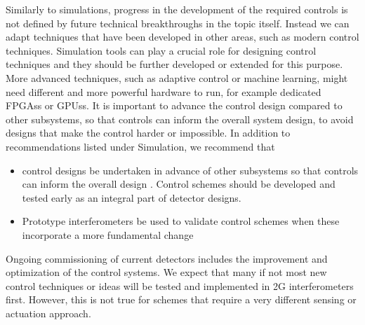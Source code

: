 Similarly to simulations, progress in the development of the required controls is not defined by future technical breakthroughs in the topic itself. Instead we can adapt techniques that have been developed in other areas, such as modern control techniques. Simulation tools can play a crucial role for designing control techniques and they should be further developed or extended for this purpose. More advanced techniques, such as adaptive control or machine learning, might need different and more powerful hardware to run, for example dedicated \acp{FPGA}s or \acp{GPU}s. It is important to advance the control design compared to other subsystems, so that controls can inform the overall system design, to avoid designs that make the control harder or impossible. 
In addition to recommendations listed under Simulation, we recommend that
\begin{itemize}
\item control designs be undertaken in advance of other subsystems so that controls can inform the overall design .  Control schemes should be developed and tested early as an integral part of detector designs.
\item Prototype interferometers be used to validate control schemes when these incorporate a more fundamental change
\end{itemize}

Ongoing commissioning of current detectors includes the improvement and optimization of the control systems. We expect that many if not most new control techniques or ideas will be tested and implemented in \ac{2G}  interferometers first. However, this is not true for schemes that require a very different sensing or actuation approach. 


